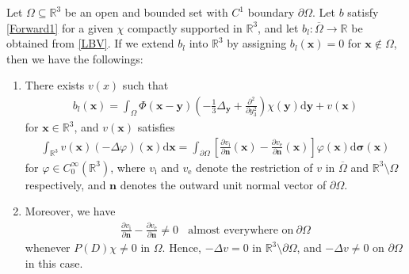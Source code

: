 \documentclass[reqno]{siamonline1116}
\numberwithin{theorem}{section}
\numberwithin{equation}{section}
\def\R{{\mathbb R}}
\def\rd{\mathrm{d}}
\def\Om{\Omega}
\def\f{\frac}
\def\p{\partial}
\def\bn{\boldsymbol{n}}
\def\x{\boldsymbol{x}}
\def\y{{\boldsymbol y}}
\def\ssi{\boldsymbol{\sigma}}
\begin{document}
\begin{theorem}\label{Th1} Let $\Om\subseteq\R^3$ be an open and bounded set with $C^1$ boundary $\p\Om$. Let $b$ satisfy \cref{Forward1} for a given $\chi$ compactly supported in $\R^3$, and let $b_l:\overline{\Om}\to\R$ be obtained from \cref{LBV}. If we extend $b_l$ into $\R^3$ by assigning $b_l(\x)=0$ for $\x\notin\Om$, then we have the followings:
\end{theorem}
{\it\begin{enumerate}
\item There exists $v(x)$ such that
\begin{align}\label{NewModeling}
b_l(\x)=\int_{\Om}\Phi(\x-\y)\left(-\f{1}{3}\Delta_{\y}+\f{\p^2}{\p y_3^2}\right)\chi(\y)\rd\y+v(\x)
\end{align}
for $\x\in\R^3$, and $v(\x)$ satisfies
\begin{align}\label{DistLapIncompatibility}
\int_{\R^3}v(\x)\left(-\Delta\varphi\right)(\x)\rd\x=\int_{\p\Om}\left[\f{\p v_{\mathrm i}}{\p\bn}(\x)-\f{\p v_{\mathrm e}}{\p\bn}(\x)\right]\varphi(\x)\rd\ssi(\x)
\end{align}
for $\varphi\in C_0^{\infty}(\R^3)$, where $v_{\mathrm i}$ and $v_{\mathrm e}$ denote the restriction of $v$ in $\overline{\Om}$ and $\R^3\setminus\Om$ respectively, and $\bn$ denotes the outward unit normal vector of $\p\Om$.
\item Moreover, we have
\begin{align}\label{NonVanishingSurfMeas}
\f{\p v_{\mathrm i}}{\p\bn}-\f{\p v_{\mathrm e}}{\p\bn}\neq0~~~~\text{almost everywhere on}~\p\Om
\end{align}
whenever $P(D)\chi\neq0$ in $\Om$. Hence, $-\Delta v=0$ in $\R^3\setminus\p\Om$, and $-\Delta v\neq0$ on $\p\Om$ in this case.
\end{enumerate}}

\end{document}
